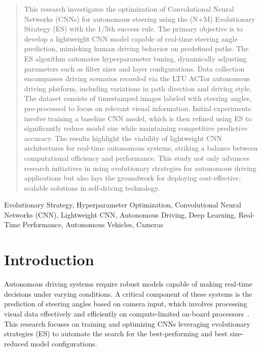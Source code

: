 \documentclass[conference]{IEEEtran}
\begin{document}
\begin{abstract}
    This research investigates the optimization of Convolutional Neural Networks (CNNs) for autonomous steering using the (N+M) Evolutionary Strategy (ES) with the 1/5th success rule. The primary objective is to develop a lightweight CNN model capable of real-time steering angle prediction, mimicking human driving behavior on predefined paths. The ES algorithm automates hyperparameter tuning, dynamically adjusting parameters such as filter sizes and layer configurations. Data collection encompasses driving scenarios recorded via the LTU ACTor autonomous driving platform, including variations in path direction and driving style. The dataset consists of timestamped images labeled with steering angles, pre-processed to focus on relevant visual information. Initial experiments involve training a baseline CNN model, which is then refined using ES to significantly reduce model size while maintaining competitive predictive accuracy. The results highlight the viability of lightweight CNN architectures for real-time autonomous systems, striking a balance between computational efficiency and performance. This study not only advances research initiatives in using evolutionary strategies for autonomous driving applications but also lays the groundwork for deploying cost-effective, scalable solutions in self-driving technology.
\end{abstract}

\begin{IEEEkeywords}
    Evolutionary Strategy, Hyperparameter Optimization, Convolutional Neural Networks (CNN), Lightweight CNN, Autonomous Driving, Deep Learning, Real-Time Performance, Autonomous Vehicles, Cameras
\end{IEEEkeywords}

\section{Introduction}
Autonomous driving systems require robust models capable of making real-time decisions under varying conditions. A critical component of these systems is the prediction of steering angles based on camera input, which involves processing visual data effectively and efficiently on compute-limited on-board processors~\cite{PilotNET_application}. This research focuses on training and optimizing CNNs leveraging evolutionary strategies (ES) to automate the search for the best-performing and best size-reduced model configurations.
\end{document}
